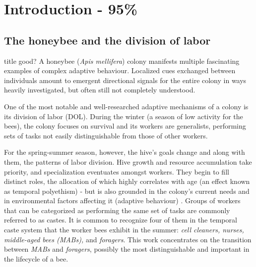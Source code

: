 
\chapter{Introduction - 95\%}  %

\ifpdf
    \graphicspath{{Chapters/Chapter1/Figs/Raster/}{Chapters/Chapter1/Figs/PDF/}{Chapters/Chapter1/Figs/}}
\else
    \graphicspath{{Chapters/Chapter1/Figs/Vector/}{Chapters/Chapter1/Figs/}}
\fi


\section{The honeybee and the division of labor} %
title good?
A honeybee (\textit{Apis mellifera}) colony manifests multiple fascinating
examples of complex adaptive behaviour. Localized cues exchanged between
individuals amount to emergent directional signals for the entire colony in ways
heavily investigated, but often still not completely understood. 

One of the most notable and well-researched adaptive mechanisms of a colony is
its division of labor (DOL). During the winter (a season of low activity for the
bees), the colony focuses on survival and its workers are generalists,
performing sets of tasks not easily distinguishable from those of other workers.


For the spring-summer season, however, the hive’s goals change and along with
them, the patterns of labor division. Hive growth and resource accumulation take
priority, and specialization eventuates amongst workers. They begin to fill
distinct roles, the allocation of which highly correlates with age (an effect
known as temporal polyethism) - but is also grounded in the colony’s current
needs and in environmental factors affecting it (adaptive behaviour)
\citep{seeley_adaptive_1982}. Groups of workers that can be categorized as
performing the same set of tasks are commonly referred to as castes. It is
common to recognize four of them in the temporal caste system that the worker
bees exhibit in the summer: \textit{cell cleaners, nurses, middle-aged bees
(MABs),} and \textit{foragers}. This work concentrates on the transition between
\textit{MABs} and \textit{foragers}, possibly the most distinguishable and
important in the lifecycle of a bee.


